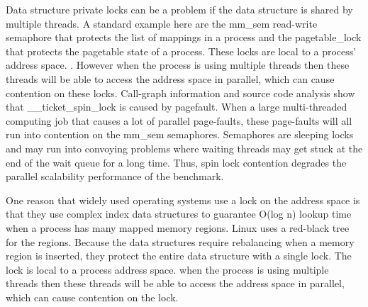 
Data structure private locks can be a problem 
if the data structure is shared by multiple threads. 
A standard example here are the mm\_sem read-write semaphore 
that protects the list of mappings in a process and 
the pagetable\_lock that protects the pagetable state of a process. 
These locks are local to a process’ address space. 
. 
However when the process is using multiple threads 
then these threads will be able to access the address space in parallel,
which can cause contention on these locks.
Call-graph information and source code analysis show that 
\_\_ticket\_spin\_lock is caused by pagefault.
When a large multi-threaded computing job 
that causes a lot of parallel page-faults, 
these page-faults will all run into contention on the mm\_sem semaphores.
Semaphores are sleeping locks 
and may run into convoying problems 
where waiting threads may 
get stuck at the end of the wait queue for a long time.\cite{Andi2009lmulticore}
Thus, spin lock 
contention degrades the parallel scalability performance of 
the benchmark. 

One reason that widely used operating systems 
use a lock on the address space is 
that they use complex index data structures to guarantee O(log n)
lookup time when a process has many mapped memory
regions. Linux uses a red-black tree for the regions\cite{linux}. 
Because the data structures require rebalancing 
when a memory region is inserted, 
they protect the entire data structure with a single lock.
The lock is local to a process address space.
when the process is using multiple threads 
then these threads will be able to access
the address space in parallel, 
which can cause contention on the lock.

